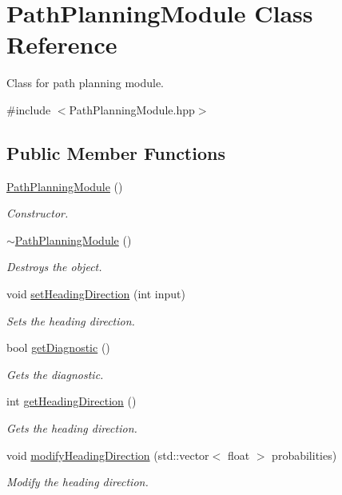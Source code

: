 \hypertarget{class_path_planning_module}{}\section{Path\+Planning\+Module Class Reference}
\label{class_path_planning_module}


Class for path planning module.  




{\ttfamily \#include $<$Path\+Planning\+Module.\+hpp$>$}

\subsection*{Public Member Functions}
\begin{DoxyCompactItemize}
\item 
\hyperlink{class_path_planning_module_a45510d19b199ab89cecc1bf6e8b252eb}{Path\+Planning\+Module} ()
\begin{DoxyCompactList}\small\item\em Constructor. \end{DoxyCompactList}\item 
\hyperlink{class_path_planning_module_acc73ccfa18e08a1771b72bb418d96258}{$\sim$\+Path\+Planning\+Module} ()
\begin{DoxyCompactList}\small\item\em Destroys the object. \end{DoxyCompactList}\item 
void \hyperlink{class_path_planning_module_ab44f3d8c24aa57a71ceac2eb71c09c2d}{set\+Heading\+Direction} (int input)
\begin{DoxyCompactList}\small\item\em Sets the heading direction. \end{DoxyCompactList}\item 
bool \hyperlink{class_path_planning_module_a19d31df2f1edafc25580c0c07151e014}{get\+Diagnostic} ()
\begin{DoxyCompactList}\small\item\em Gets the diagnostic. \end{DoxyCompactList}\item 
int \hyperlink{class_path_planning_module_a9aa558d9c088584cbaf37ecede8890b9}{get\+Heading\+Direction} ()
\begin{DoxyCompactList}\small\item\em Gets the heading direction. \end{DoxyCompactList}\item 
void \hyperlink{class_path_planning_module_ae760345016ddc0c7b9381f86240a6ddf}{modify\+Heading\+Direction} (std\+::vector$<$ float $>$ probabilities)
\begin{DoxyCompactList}\small\item\em Modify the heading direction. \end{DoxyCompactList}\end{DoxyCompactItemize}



